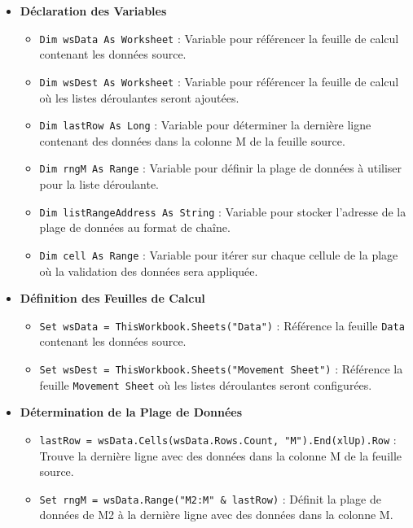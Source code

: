 \documentclass[a4paper, oneside, 12pt, final]{extreport}
\begin{document}
\begin{itemize}
    \item \textbf{Déclaration des Variables}
    \begin{itemize}
        \item \texttt{Dim wsData As Worksheet} : Variable pour référencer la feuille de calcul contenant les données source.
        \item \texttt{Dim wsDest As Worksheet} : Variable pour référencer la feuille de calcul où les listes déroulantes seront ajoutées.
        \item \texttt{Dim lastRow As Long} : Variable pour déterminer la dernière ligne contenant des données dans la colonne M de la feuille source.
        \item \texttt{Dim rngM As Range} : Variable pour définir la plage de données à utiliser pour la liste déroulante.
        \item \texttt{Dim listRangeAddress As String} : Variable pour stocker l'adresse de la plage de données au format de chaîne.
        \item \texttt{Dim cell As Range} : Variable pour itérer sur chaque cellule de la plage où la validation des données sera appliquée.
    \end{itemize}

    \item \textbf{Définition des Feuilles de Calcul}
    \begin{itemize}
        \item \texttt{Set wsData = ThisWorkbook.Sheets("Data")} : Référence la feuille \texttt{Data} contenant les données source.
        \item \texttt{Set wsDest = ThisWorkbook.Sheets("Movement Sheet")} : Référence la feuille \texttt{Movement Sheet} où les listes déroulantes seront configurées.
    \end{itemize}

    \item \textbf{Détermination de la Plage de Données}
    \begin{itemize}
        \item \texttt{lastRow = wsData.Cells(wsData.Rows.Count, "M").End(xlUp).Row} : Trouve la dernière ligne avec des données dans la colonne M de la feuille source.
        \item \texttt{Set rngM = wsData.Range("M2:M" \& lastRow)} : Définit la plage de données de M2 à la dernière ligne avec des données dans la colonne M.
    \end{itemize}


\end{itemize}
\end{document}
